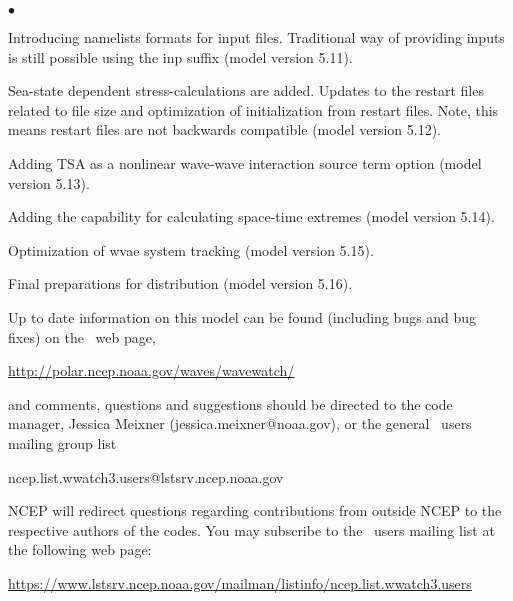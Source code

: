 \begin{list}{$\bullet$}{\rightmargin 5mm \parsep 0mm \itemsep 0mm}
\item Introducing namelists formats for input files. Traditional way of providing inputs is still possible using the inp suffix (model version 5.11).

\item Sea-state dependent stress-calculations are added.  Updates to the restart files related to file size and optimization of initialization from restart files. Note, this means restart files are not backwards compatible  (model version 5.12).

\item Adding TSA as a nonlinear wave-wave interaction source term option (model version 5.13).

\item Adding the capability for calculating space-time extremes (model version 5.14).

\item Optimization of wvae system tracking (model version 5.15).

\item Final preparations for distribution (model version 5.16). 

\end{list}

\vspace{\baselineskip} \noindent 
Up to date information on this model can be found (including bugs and bug
fixes) on the \ws\ web page, 
\begin{center}
\url{http://polar.ncep.noaa.gov/waves/wavewatch/}
\end{center}
and comments, questions and suggestions should be
directed to the code manager, Jessica Meixner (jessica.meixner@noaa.gov), or the general \ws\ users mailing group list

\begin{center}
ncep.list.wwatch3.users@lstsrv.ncep.noaa.gov
\end{center}

\noindent
NCEP will redirect questions regarding contributions from outside NCEP to the
respective authors of the codes. You may subscribe to the \ws\ users 
mailing list at the following web page:
\begin{center}
\footnotesize
\url{https://www.lstsrv.ncep.noaa.gov/mailman/listinfo/ncep.list.wwatch3.users}
\end{center} 


